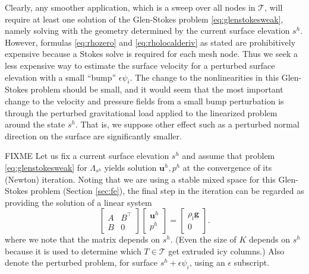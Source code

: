 \documentclass[letterpaper,final,12pt,reqno]{amsart}
\theoremstyle{claim}
\newcommand{\eps}{\epsilon}
\newcommand{\bg}{\mathbf{g}}
\newcommand{\bu}{\mathbf{u}}
\newcommand{\rhoi}{\rho_{\text{i}}}
\numberwithin{equation}{section}
\numberwithin{figure}{section}
\numberwithin{table}{section}
\numberwithin{theorem}{section}
\begin{document}
Clearly, any smoother application, which is a sweep over all nodes in $\mathcal{T}$, will require at least one solution of the Glen-Stokes problem \eqref{eq:glenstokesweak}, namely solving with the geometry determined by the current surface elevation $s^h$.  However, formulas \eqref{eq:rhozero} and \eqref{eq:rholocalderiv} as stated are prohibitively expensive because a Stokes solve is required  for each mesh node.  Thus we seek a less expensive way to estimate the surface velocity for a perturbed surface elevation with a small ``bump'' $\eps\psi_i$.  The change to the nonlinearities in this Glen-Stokes problem should be small, and it would seem that the most important change to the velocity and pressure fields from a small bump perturbation is through the perturbed gravitational load applied to the linearized problem around the state $s^h$.  That is, we suppose other effect such as a perturbed normal direction on the surface are significantly smaller.

FIXME Let us fix a current surface elevation $s^h$ and assume that problem \eqref{eq:glenstokesweak} for $\Lambda_{s^h}$ yields solution $\bu^h,p^h$ at the convergence of its (Newton) iteration.  Noting that we are using a stable mixed space for this Glen-Stokes problem (Section \ref{sec:fe}), the final step in the iteration can be regarded as providing the solution of a linear system
\begin{equation}
    \begin{bmatrix} A & B^\top \\
                    B & 0      \end{bmatrix}
    \begin{bmatrix} \bu^h \\ p^h \end{bmatrix}
    = \begin{bmatrix} \rhoi \bg \\ 0 \end{bmatrix}.  \label{eq:system}
\end{equation}
where we note that the matrix depends on $s^h$.  (Even the size of $K$ depends on $s^h$ because it is used to determine which $T\in\mathcal{T}$ get extruded icy columns.)  Also denote the perturbed problem, for surface $s^h + \eps \psi_i$, using an $\eps$ subscript.
\end{document}
